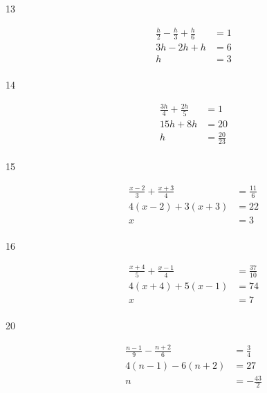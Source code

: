 \documentclass[letterpaper, landscape]{exam}
\begin{document}
\begin{description}
      \item[13] 
        \begin{align*}
          \frac{h}{2} - \frac{h}{3} + \frac{h}{6} & = 1 \\
          3h - 2h + h                             & = 6 \\
          h                                       & = \boxed{ 3 } \\
        \end{align*}

      \item[14] 
        \begin{align*}
          \frac{3h}{4} + \frac{2h}{5} & = 1 \\
          15h + 8h                    & = 20 \\
          h                           & = \boxed{ \frac{20}{23} } \\
        \end{align*}

      \item[15] 
        \begin{align*}
          \frac{x - 2}{3} + \frac{x + 3}{4} & = \frac{11}{6} \\
          4(x - 2) + 3(x + 3)               & = 22 \\
          x                                 & = \boxed{ 3 } \\
        \end{align*}

      \item[16] 
        \begin{align*}
          \frac{x + 4}{5} + \frac{x - 1}{4} & = \frac{37}{10} \\
          4 (x + 4) + 5 (x - 1)             & = 74 \\
          x                                 & = \boxed{ 7 } \\
        \end{align*}

      \item[20] 
        \begin{align*}
          \frac{n - 1}{9} - \frac{n + 2}{6}            & = \frac{3}{4} \\
          4(n - 1) - 6(n + 2)                          & = 27 \\
          n                                            & = \boxed{ - \frac{43}{2} } \\
        \end{align*}


\end{description}
\end{document}
